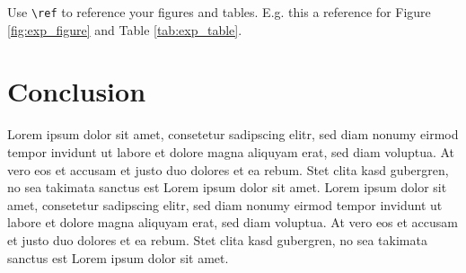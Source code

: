 \documentclass[12pt]{article}
\begin{document}
Use \texttt{\textbackslash ref} to reference your figures and tables. E.g. this a reference for Figure \ref{fig:exp_figure} and Table \ref{tab:exp_table}.

\section{Conclusion}
Lorem ipsum dolor sit amet, consetetur sadipscing elitr, sed diam nonumy eirmod tempor invidunt ut labore et dolore magna aliquyam erat, sed diam voluptua. At vero eos et accusam et justo duo dolores et ea rebum. Stet clita kasd gubergren, no sea takimata sanctus est Lorem ipsum dolor sit amet. Lorem ipsum dolor sit amet, consetetur sadipscing elitr, sed diam nonumy eirmod tempor invidunt ut labore et dolore magna aliquyam erat, sed diam voluptua. At vero eos et accusam et justo duo dolores et ea rebum. Stet clita kasd gubergren, no sea takimata sanctus est Lorem ipsum dolor sit amet.




\end{document}

